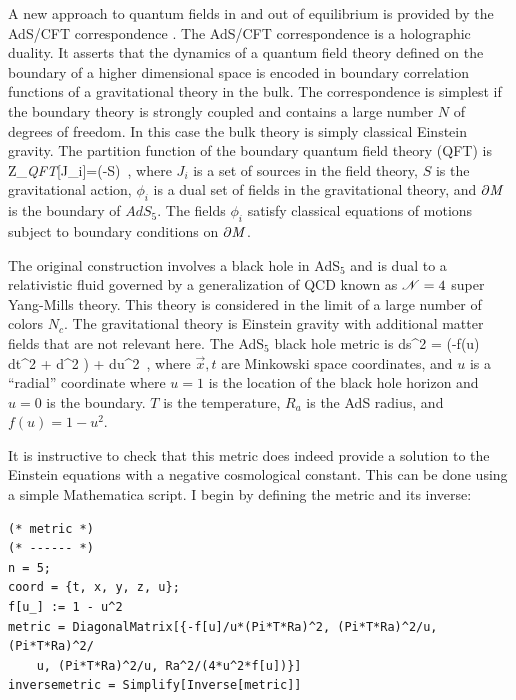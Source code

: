  A new approach to quantum fields in and out of equilibrium is provided
by the AdS/CFT correspondence \cite{Maldacena:1997re,Son:2007vk,Gubser:2009md,CasalderreySolana:2011us,DeWolfe:2013cua}.
The AdS/CFT correspondence is a holographic duality. It asserts that the
dynamics of a quantum field theory defined on the boundary of a higher 
dimensional space is encoded in boundary correlation functions of a 
gravitational theory in the bulk. The correspondence is simplest if 
the boundary theory is strongly coupled and contains a large number 
$N$ of degrees of freedom. In this case the bulk theory is simply classical 
Einstein gravity. The partition function of the boundary quantum 
field theory (QFT) is 
\be 
 Z_{\it QFT}[J_i]=\exp\left(-S\left[\left.\phi_i\right|_{\partial{\it M}}
= J_i\right]\right)\, , 
\ee
where $J_i$ is a set of sources in the field theory, $S$ is the gravitational 
action, $\phi_i$ is a dual set of fields in the gravitational theory, and 
$\partial{\it M}$ is the boundary of $AdS_5$. The fields $\phi_i$ satisfy 
classical equations of motions subject to boundary conditions on 
$\partial{\it M}$.

 The original construction involves a black hole in AdS$_5$ and is dual 
to a relativistic fluid governed by a generalization of QCD known as 
${\cal N}=4$ super Yang-Mills theory. This theory is considered in 
the limit of a large number of colors $N_c$. The gravitational theory 
is Einstein gravity with additional matter fields that are not 
relevant here. The AdS$_5$ black hole metric is  
\be
\label{bh_son}
ds^2 =   \left(-f(u) dt^2 + d^2 \right) + 
   du^2\, ,
\ee
where $\vec{x},t$ are Minkowski space coordinates, and $u$ is a 
``radial'' coordinate where $u=1$ is the location of the black hole 
horizon and $u=0$ is the boundary. $T$ is the temperature, $R_a$ is the 
AdS radius, and $f(u)=1-u^2$. 

 It is instructive to check that this metric does indeed provide a 
solution to the Einstein equations with a negative cosmological 
constant. This can be done using a simple Mathematica script. I begin
by defining the metric and its inverse: 

\vspace*{0.3cm} 
\begin{lstlisting}
(* metric *)
(* ------ *)
n = 5;
coord = {t, x, y, z, u};
f[u_] := 1 - u^2
metric = DiagonalMatrix[{-f[u]/u*(Pi*T*Ra)^2, (Pi*T*Ra)^2/u, (Pi*T*Ra)^2/
    u, (Pi*T*Ra)^2/u, Ra^2/(4*u^2*f[u])}]
inversemetric = Simplify[Inverse[metric]]
\end{lstlisting}

